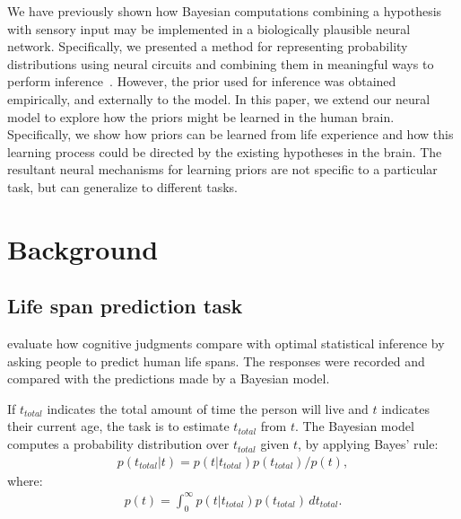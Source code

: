 \documentclass[10pt,letterpaper]{article}
\begin{document}

We have previously shown how Bayesian computations combining a hypothesis with sensory input may be implemented in a biologically plausible neural network. Specifically, we presented a method for representing probability distributions using neural circuits and combining them in meaningful ways to perform inference~\cite{sharma2017}. However, the prior used for inference was obtained empirically, and externally to the model. In this paper, we extend our neural model to explore how the priors might be learned in the human brain. Specifically, we show how priors can be learned from life experience and how this learning process could be directed by the existing hypotheses in the brain. The resultant neural mechanisms for learning priors are not specific to a particular task, but can generalize to different tasks.



\section{Background}

\subsection{Life span prediction task}

 evaluate how cognitive judgments compare with optimal statistical inference by asking people to predict human life spans. The responses were recorded and compared with the predictions made by a Bayesian model.

If $t_{total}$ indicates the total amount of time the person will live and $t$ indicates their current age, the task is to estimate $t_{total}$ from $t$. The Bayesian model computes a probability distribution over $t_{total}$ given $t$, by applying Bayes' rule:
\begin{equation}
\label{eqn:bayes_rule}
\begin{aligned}
p(t_{total} | t) = p(t | t_{total})p(t_{total}) / p(t) ,
\end{aligned}
\end{equation}
where:
\begin{equation}
\label{eqn:p_t}
\begin{aligned}
p(t) = \int_{0}^\infty p(t | t_{total})p(t_{total}) \, dt_{total} .
\end{aligned}
\end{equation}
\end{document}

